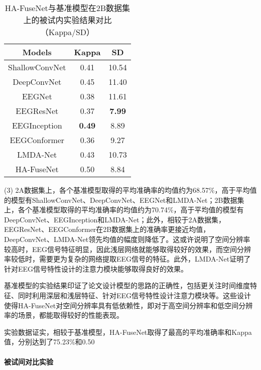 \begin{table}[H]
    \centering
    \caption{HA-FuseNet与基准模型在2B数据集上的被试内实验结果对比（Kappa/SD）}
    \label{tab:2bcompareinsd}
    \begin{tabularx}{\textwidth}{CCC}
      \toprule
      Models & Kappa & SD \\
      \midrule
      ShallowConvNet\cite{schirrmeister2017deep} &0.41&10.54\\
      DeepConvNet\cite{schirrmeister2017deep} &0.45&11.40\\
      EEGNet\cite{lawhern2018eegnet} &0.38& 11.61\\
      EEGResNet\cite{HBM:HBM23730} &0.37&\textbf{7.99}\\
      EEGInception\cite{zhang2021eeg} &\textbf{0.49}&8.89\\
      EEGConformer\cite{song2022eeg} &0.36&9.27\\
      LMDA-Net\cite{miao2023lmda} &0.43&10.73\\
      \midrule 
      HA-FuseNet &0.50&8.84\\
      \bottomrule
    \end{tabularx}
\end{table}

(3) 2A数据集上，各个基准模型取得的平均准确率的均值约为68.57\%，高于平均值的模型有ShallowConvNet、DeepConvNet、EEGNet和LMDA-Net；2B数据集上，各个基准模型取得的平均准确率的均值约为70.74\%，高于平均值的模型有DeepConvNet、EEGInception和LMDA-Net；此外，相较于2A数据集，EEGResNet、EEGConformer在2B数据集上的准确率更接近均值，DeepConvNet、LMDA-Net领先均值的幅度则降低了。这或许说明了空间分辨率较高时，EEG信号特征明显，因此浅层网络就能够取得较好的效果，而空间分辨率较低时，需要更为复杂的网络提取EEG信号的特征。此外，LMDA-Net证明了针对EEG信号特性设计的注意力模块能够取得良好的效果。

基准模型的实验结果印证了论文设计模型的思路的正确性，包括更关注时间维度特征、同时利用深层和浅层特征、针对EEG信号特性设计注意力模块等。这些设计使得HA-FuseNet对空间分辨率具有低依赖性，即对于高空间分辨率和低空间分辨率的场景，都能取得较好的性能表现。

实验数据证实，相较于基准模型，HA-FuseNet取得了最高的平均准确率和Kappa值，分别达到了75.23\%和0.50

\paragraph{被试间对比实验}

